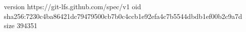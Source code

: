 version https://git-lfs.github.com/spec/v1
oid sha256:7230c4ba86421dc79479500cb7b0c4ccb1e92efa4c7b5544dbdb1ef00b2c9a7d
size 394351
